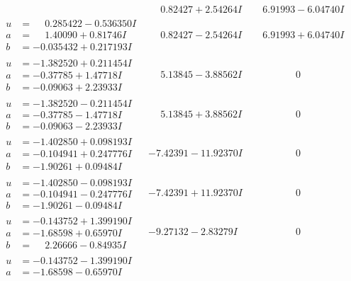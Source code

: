 \documentclass[1p]{elsarticle_modified}
\theoremstyle{definition}
\begin{document}
$$\begin{array}{c|c|c}
 & \phantom{-}0.82427 + 2.54264 I & \phantom{-}6.91993 - 6.04740 I \\ \hline\begin{aligned}
u &= \phantom{-}0.285422 - 0.536350 I \\
a &= \phantom{-}1.40090 + 0.81746 I \\
b &= -0.035432 + 0.217193 I\end{aligned}
 & \phantom{-}0.82427 - 2.54264 I & \phantom{-}6.91993 + 6.04740 I \\ \hline\begin{aligned}
u &= -1.382520 + 0.211454 I \\
a &= -0.37785 + 1.47718 I \\
b &= -0.09063 + 2.23933 I\end{aligned}
 & \phantom{-}5.13845 - 3.88562 I & \phantom{-0.000000 } 0 \\ \hline\begin{aligned}
u &= -1.382520 - 0.211454 I \\
a &= -0.37785 - 1.47718 I \\
b &= -0.09063 - 2.23933 I\end{aligned}
 & \phantom{-}5.13845 + 3.88562 I & \phantom{-0.000000 } 0 \\ \hline\begin{aligned}
u &= -1.402850 + 0.098193 I \\
a &= -0.104941 + 0.247776 I \\
b &= -1.90261 + 0.09484 I\end{aligned}
 & -7.42391 - 11.92370 I & \phantom{-0.000000 } 0 \\ \hline\begin{aligned}
u &= -1.402850 - 0.098193 I \\
a &= -0.104941 - 0.247776 I \\
b &= -1.90261 - 0.09484 I\end{aligned}
 & -7.42391 + 11.92370 I & \phantom{-0.000000 } 0 \\ \hline\begin{aligned}
u &= -0.143752 + 1.399190 I \\
a &= -1.68598 + 0.65970 I \\
b &= \phantom{-}2.26666 - 0.84935 I\end{aligned}
 & -9.27132 - 2.83279 I & \phantom{-0.000000 } 0 \\ \hline\begin{aligned}
u &= -0.143752 - 1.399190 I \\
a &= -1.68598 - 0.65970 I \\

\end{aligned}
\end{array}$$
\end{document}
